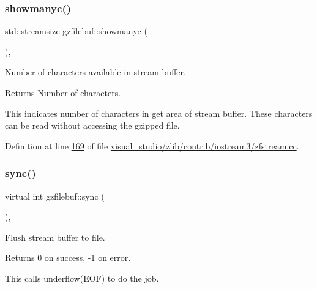 \subsubsection{\texorpdfstring{showmanyc()}{showmanyc()}\hspace{0.1cm}{\footnotesize\ttfamily [2/2]}}
{\footnotesize\ttfamily std\+::streamsize gzfilebuf\+::showmanyc (\begin{DoxyParamCaption}{ }\end{DoxyParamCaption})\hspace{0.3cm}{\ttfamily [protected]}, {\ttfamily [virtual]}}



Number of characters available in stream buffer. 

\begin{DoxyReturn}{Returns}
Number of characters.
\end{DoxyReturn}
This indicates number of characters in get area of stream buffer. These characters can be read without accessing the gzipped file. 

Definition at line \hyperlink{visual__studio_2zlib_2contrib_2iostream3_2zfstream_8cc_source_l00169}{169} of file \hyperlink{visual__studio_2zlib_2contrib_2iostream3_2zfstream_8cc_source}{visual\+\_\+studio/zlib/contrib/iostream3/zfstream.\+cc}.

\mbox{\label{classgzfilebuf_a8fdf6b079487c0034cb920c63c9eaf55}} 
\subsubsection{\texorpdfstring{sync()}{sync()}\hspace{0.1cm}{\footnotesize\ttfamily [1/2]}}
{\footnotesize\ttfamily virtual int gzfilebuf\+::sync (\begin{DoxyParamCaption}{ }\end{DoxyParamCaption})\hspace{0.3cm}{\ttfamily [protected]}, {\ttfamily [virtual]}}



Flush stream buffer to file. 

\begin{DoxyReturn}{Returns}
0 on success, -\/1 on error.
\end{DoxyReturn}
This calls underflow(\+E\+O\+F) to do the job. \mbox{\label{classgzfilebuf_a8fdf6b079487c0034cb920c63c9eaf55}} 
